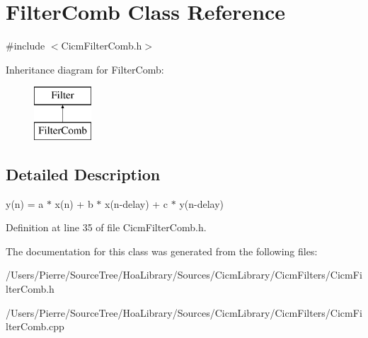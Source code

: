 \hypertarget{class_filter_comb}{\section{Filter\-Comb Class Reference}
\label{class_filter_comb}
}


{\ttfamily \#include $<$Cicm\-Filter\-Comb.\-h$>$}

Inheritance diagram for Filter\-Comb\-:\begin{figure}[H]
\begin{center}
\leavevmode
\includegraphics[height=2.000000cm]{class_filter_comb}
\end{center}
\end{figure}


\subsection{Detailed Description}
y(n) = a $\ast$ x(n) + b $\ast$ x(n-\/delay) + c $\ast$ y(n-\/delay) 

Definition at line 35 of file Cicm\-Filter\-Comb.\-h.



The documentation for this class was generated from the following files\-:\begin{DoxyCompactItemize}
\item 
/\-Users/\-Pierre/\-Source\-Tree/\-Hoa\-Library/\-Sources/\-Cicm\-Library/\-Cicm\-Filters/Cicm\-Filter\-Comb.\-h\item 
/\-Users/\-Pierre/\-Source\-Tree/\-Hoa\-Library/\-Sources/\-Cicm\-Library/\-Cicm\-Filters/Cicm\-Filter\-Comb.\-cpp\end{DoxyCompactItemize}
